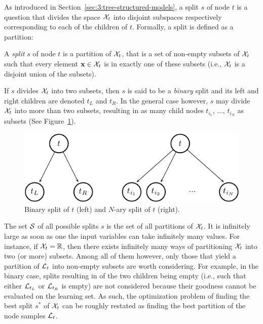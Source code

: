 As introduced in Section~\ref{sec:3:tree-structured-models}, a
split $s$ of node $t$ is  a question that divides the space ${\cal X}_t$ into
disjoint subspaces respectively  corresponding to each of the children of $t$.
Formally, a split is defined as a partition:

\begin{definition}
A \emph{split} $s$ of node $t$ is a partition of ${\cal X}_t$, that is a set of
non-empty subsets of ${\cal X}_t$ such that every element $\mathbf{x} \in {\cal X}_t$
is in exactly one of these subsets (i.e., ${\cal X}_t$ is a disjoint union
of the subsets).
\end{definition}

If $s$ divides ${\cal X}_t$ into two subsets, then $s$ is said to be a
\textit{binary} split and its left and right children are denoted $t_L$ and
$t_R$. In the general case however, $s$ may divide ${\cal X}_t$ into more than
two subsets, resulting in as many child nodes $t_{i_1}$, ..., $t_{i_N}$ as
subsets (See Figure~\ref{fig:3:splits}).

\begin{figure}[b]
    \centering
    \includegraphics[scale=1.0]{figures/ch3_splits.pdf}
    \caption{Binary split of $t$ (left) and $N$-ary split of $t$ (right).}
    \label{fig:3:splits}
\end{figure}

The set ${\cal S}$ of all possible splits $s$ is the set of all partitions of
${\cal X}_t$. It is infinitely large as soon as one the input variables can
take infinitely many values. For instance, if ${\cal X}_t = \mathbb{R}$, then
there exists infinitely many ways of partitioning ${\cal X}_t$ into two (or
more) subsets. Among all of them however, only those that yield a partition of
${\cal L}_t$ into non-empty subsets are worth considering. For example, in the
binary case, splits resulting in of the two children being empty (i.e., such
that either ${\cal L}_{t_L}$ or ${\cal L}_{t_R}$ is empty) are not considered
because their goodness cannot be evaluated on the learning set. As such, the
optimization problem of finding the best split $s^*$ of ${\cal X}_t$ can be
roughly restated as finding the best partition of the node samples ${\cal L}_t$.

